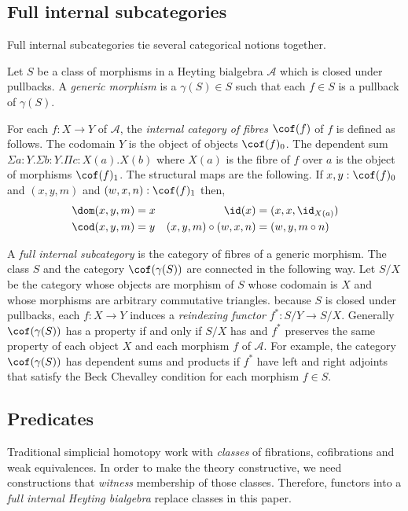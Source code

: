 \documentclass{tac}
\newcommand\cat\mathcal
\newcommand\ri{^*}
\newcommand\of{:}
\newcommand\gen\gamma
\begin{document}
\subsection{Full internal subcategories}\label{full internal subcategory}
Full internal subcategories tie several categorical notions together. 

Let $S$ be a class of morphisms in a Heyting bialgebra $\cat A$ which is closed under pullbacks. A \emph{generic morphism} is a $\gen(S)\in S$ such that each $f\in S$ is a pullback of $\gen(S)$.


For each $f\of X\to Y$ of $\cat A$, the \emph{internal category of fibres} $\cof(f)$ of $f$ is defined as follows. The codomain $Y$ is the object of objects $\cof(f)_0$. The dependent sum $\Sigma a\of Y.\Sigma b\of Y.\Pi c\of X(a).X(b)$ where $X(a)$ is the fibre of $f$ over $a$ is the object of morphisms $\cof(f)_1$. The structural maps are the following. If $x,y\of \cof(f)_0$ and $(x,y,m)$ and $(w,x,n)\of\cof(f)_1$ then,
\begin{align*}
\dom(x,y,m) &= x & 
\id(x) &= (x,x,\id_{X(a)})\\
\cod(x,y,m) &= y &
(x,y,m)\circ (w,x,n) &= (w,y,m\circ n)
\end{align*}\label{category of fibres}

A \emph{full internal subcategory} is the category of fibres of a generic morphism. The class $S$ and the category $\cof(\gen(S))$ are connected in the following way. Let $S/X$ be the category whose objects are morphism of $S$ whose codomain is $X$ and whose morphisms are arbitrary commutative triangles. because $S$ is closed under pullbacks, each $f\of X\to Y$ induces a \emph{reindexing functor} $f\ri\of S/Y\to S/X$. Generally $\cof(\gen(S))$ has a property if and only if $S/X$ has and $f\ri$ preserves the same property of each object $X$ and each morphism $f$ of $\cat A$. For example, the category $\cof(\gen(S))$ has dependent sums and products if $f\ri$ have left and right adjoints that satisfy the Beck Chevalley condition for each morphism $f\in S$.

\subsection{Predicates} Traditional simplicial homotopy work with \emph{classes} of fibrations, cofibrations and weak equivalences. In order to make the theory constructive, we need constructions that \emph{witness} membership of those classes. Therefore, functors into a \emph{full internal Heyting bialgebra} replace classes in this paper. 
\end{document}
